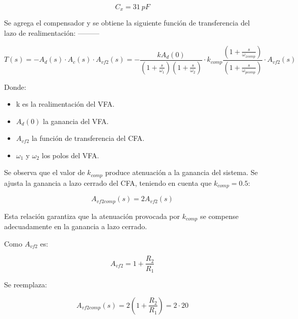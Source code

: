 \begin{equation}
    \boxed{
    C_x = 31~pF
    }
\end{equation}

\hspace{1mm} Se agrega el compensador y se obtiene la siguiente función de transferencia del lazo de realimentación: ---------

\begin{equation}
    T(s) = -A_d(s) \cdot A_c(s) \cdot A_{vf2} (s) = - \frac{kA_d(0)}{\left(1+\frac{s}{\omega_1}\right)\left(1+\frac{s}{\omega_2}\right)} \cdot k_{comp} \frac{\left(1 + \frac{s}{\omega_{zcomp}}\right)}{\left(1+\frac{s}{\omega_{pcomp}}\right)} \cdot A_{vf2}(s)
\end{equation}

\hspace{1mm} Donde:

\begin{itemize}[itemsep=1pt]
    \item k es la realimentación del VFA.
    \item \(A_d(0)\) la ganancia del VFA.
    \item \(A_{vf2}\) la función de transferencia del CFA.
    \item \( \omega_1 \) y \( \omega_2 \) los polos del VFA.
\end{itemize}

\hspace{1mm} Se observa que el valor de \(k_{comp}\) produce atenuación a la ganancia del sistema. Se ajusta la ganancia a lazo cerrado del CFA, teniendo en cuenta que \( k_{comp} = 0.5 \):

\begin{equation}
    A_{vf2 comp} (s) = 2A_{vf2}(s)
\end{equation}

\hspace{1mm} Esta relación garantiza que la atenuación provocada por \(k_{comp}\) se compense adecuadamente en la ganancia a lazo cerrado.

\hspace{1mm} Como \(A_{vf2}\) es:

\begin{equation}
    A_{vf2} = 1 + \frac{R_2}{R_1}
\end{equation}

\hspace{1mm} Se reemplaza:

\begin{equation}
    A_{vf2 comp} (s) = 2 \left( 1 + \frac{R_2}{R_1} \right) = 2 \cdot 20
\end{equation}


